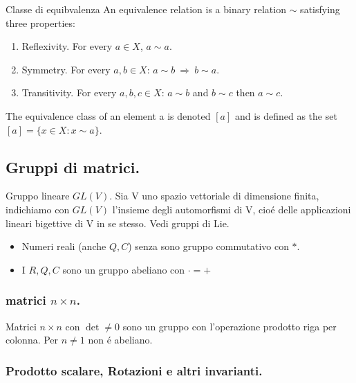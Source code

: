 \documentclass[oneside,12pt]{memoir}
\begin{document}
\begin{definition}{Classe di equibvalenza}
An equivalence relation is a binary relation $\sim$ satisfying three properties:
\begin{enumerate}
\item Reflexivity.
For every $a\in X$, $a\sim a$.
\item Symmetry.
For every $a,b\in X$: $a\sim b\ \Rightarrow\ b\sim a$.
\item Transitivity.
For every $a,b,c\in X$: $a\sim b$ and $b\sim c$ then $a\sim c$.
\end{enumerate}
The equivalence class of an element a is denoted $[a]$ and is defined as the set $[a]=\{x\in X: x\sim a\}$.
\end{definition}

\subsection{Gruppi di matrici.}

\begin{definition}{Gruppo lineare $GL(V)$.}
Sia V uno spazio vettoriale di dimensione finita, indichiamo con $GL(V)$ l'insieme degli automorfismi di V, cio\'e delle applicazioni lineari bigettive di V in se stesso. Vedi gruppi di Lie.
\end{definition}

\begin{itemize}
\item Numeri reali (anche $Q,C$) senza sono gruppo commutativo con $*$.
\item  I $R, Q, C$ sono un gruppo abeliano con $\cdot=+$
\end{itemize}

\subsubsection{matrici \texorpdfstring{$n\times n$}{nXn}.}

Matrici $n\times n$ con $\det{}\neq0$ sono un gruppo con l'operazione prodotto riga per colonna. Per $n\neq1$ non \'e abeliano.

\subsubsection{Prodotto scalare, Rotazioni e altri invarianti.}
\end{document}
